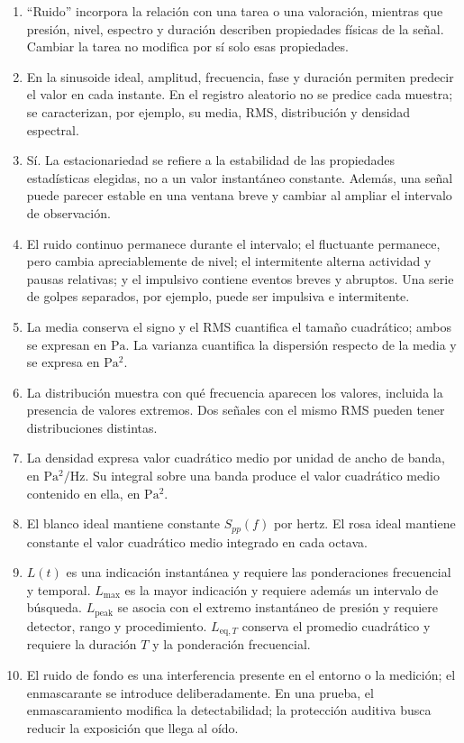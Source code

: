 \begin{enumerate}[label=\textbf{C\arabic*.},leftmargin=*]
    \item ``Ruido'' incorpora la relación con una tarea o una valoración,
    mientras que presión, nivel, espectro y duración describen propiedades
    físicas de la señal. Cambiar la tarea no modifica por sí solo esas
    propiedades.
    \item En la sinusoide ideal, amplitud, frecuencia, fase y duración permiten
    predecir el valor en cada instante. En el registro aleatorio no se predice
    cada muestra; se caracterizan, por ejemplo, su media, RMS, distribución y
    densidad espectral.
    \item Sí. La estacionariedad se refiere a la estabilidad de las
    propiedades estadísticas elegidas, no a un valor instantáneo constante.
    Además, una señal puede parecer estable en una ventana breve y cambiar al
    ampliar el intervalo de observación.
    \item El ruido continuo permanece durante el intervalo; el fluctuante
    permanece, pero cambia apreciablemente de nivel; el intermitente alterna
    actividad y pausas relativas; y el impulsivo contiene eventos breves y
    abruptos. Una serie de golpes separados, por ejemplo, puede ser impulsiva
    e intermitente.
    \item La media conserva el signo y el RMS cuantifica el tamaño cuadrático;
    ambos se expresan en \(\mathrm{Pa}\). La varianza cuantifica la dispersión
    respecto de la media y se expresa en \(\mathrm{Pa^2}\).
    \item La distribución muestra con qué frecuencia aparecen los valores,
    incluida la presencia de valores extremos. Dos señales con el mismo RMS
    pueden tener distribuciones distintas.
    \item La densidad expresa valor cuadrático medio por unidad de ancho de
    banda, en \(\mathrm{Pa^2/Hz}\). Su integral sobre una banda produce el
    valor cuadrático medio contenido en ella, en \(\mathrm{Pa^2}\).
    \item El blanco ideal mantiene constante \(S_{pp}(f)\) por hertz. El rosa
    ideal mantiene constante el valor cuadrático medio integrado en cada
    octava.
    \item \(L(t)\) es una indicación instantánea y requiere las ponderaciones
    frecuencial y temporal. \(L_{\mathrm{max}}\) es la mayor indicación y
    requiere además un intervalo de búsqueda. \(L_{\mathrm{peak}}\) se asocia
    con el extremo instantáneo de presión y requiere detector, rango y
    procedimiento. \(L_{\mathrm{eq},T}\) conserva el promedio cuadrático y
    requiere la duración \(T\) y la ponderación frecuencial.
    \item El ruido de fondo es una interferencia presente en el entorno o la
    medición; el enmascarante se introduce deliberadamente. En una prueba, el
    enmascaramiento modifica la detectabilidad; la protección auditiva busca
    reducir la exposición que llega al oído.
\end{enumerate}

